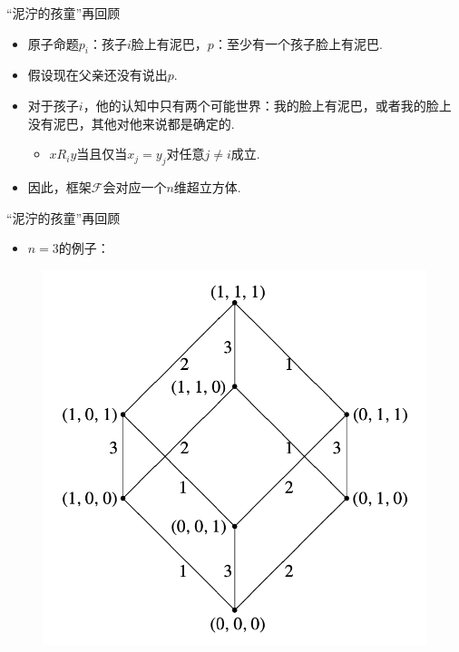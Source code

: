 \begin{frame}{“泥泞的孩童”再回顾}
\begin{itemize}
    \item 原子命题$p_i$：孩子$i$脸上有泥巴，$p$：至少有一个孩子脸上有泥巴.
    \item 假设现在父亲还没有说出$p$.
    \item 对于孩子$i$，他的认知中只有两个可能世界：我的脸上有泥巴，或者我的脸上没有泥巴，其他对他来说都是确定的.
    \begin{itemize}
        \item $x R_i y$当且仅当$x_j=y_j$对任意$j\neq i$成立.
    \end{itemize}
    \item 因此，框架$\mathcal F$会对应一个$n$维超立方体.
\end{itemize}
\end{frame}

\begin{frame}{“泥泞的孩童”再回顾}
\begin{itemize}
    \item $n=3$的例子：
\end{itemize}
\begin{figure}
    \centering
    \includegraphics[scale=0.4]{Figures/modal-logic/cubic-example.png}
\end{figure}
\end{frame}


